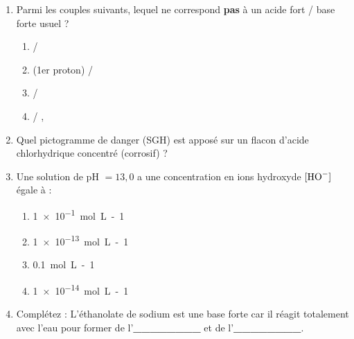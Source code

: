 \documentclass[11pt]{article}
\begin{document}
\begin{exercice}
\begin{enumerate}
    \item Parmi les couples suivants, lequel ne correspond \textbf{pas} à un acide fort / base forte usuel ?
    \begin{enumerate}
        \item {} / 
        \item {} (1er proton) / 
        \item {} / 
        \item {} / , 
    \end{enumerate}
    \item Quel pictogramme de danger (SGH) est apposé sur un flacon d'acide chlorhydrique concentré (corrosif) ?
    \item Une solution de pH $= 13,0$ a une concentration en ions hydroxyde $[\ce{HO-}]$ égale à :
    \begin{enumerate}
        \item \SI{1e-1}{mol.L-1}
        \item \SI{1e-13}{mol.L-1}
        \item \SI{0,1}{mol.L-1}
        \item \SI{1e-14}{mol.L-1}
    \end{enumerate}
    \item Complétez : L'éthanolate de sodium  est une base forte car il réagit totalement avec l'eau pour former de l'\textbf{\_\_\_\_\_\_\_\_} et de l'\textbf{\_\_\_\_\_\_\_\_}.
\end{enumerate}
\end{exercice}
\end{document}
